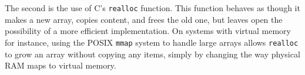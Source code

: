 \documentclass{article}
\begin{document}
The second is the use of C's \verb+realloc+ function.
This function behaves as though it makes a new array, copies content,
and frees the old one, but leaves open the possibility of a
more efficient implementation.
On systems with virtual memory for instance, using the POSIX
\verb+mmap+ system to handle large arrays allows \verb+realloc+
to grow an array without copying any items, simply by changing
the way physical RAM maps to virtual memory.
\end{document}
